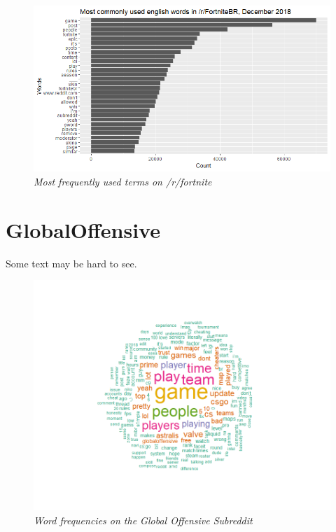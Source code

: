 \begin{figure}[H]
    \centering
    \includegraphics[width=1.0\textwidth]{graphs/Fortnite/WordFreq_FortniteBR.png}
    \caption{\textit{Most frequently used terms on /r/fortnite}}
    \label{fig:fortnite_wordfreq}
\end{figure}

\section{GlobalOffensive}
\label{sec:globaloffensive}
Some text may be hard to see.
\begin{figure}[ht]
    \centering
    \includegraphics[width=1.0\textwidth]{graphs/GlobalOffensive/wordcloud_rcsgo.png}
    \caption{\textit{Word frequencies on the Global Offensive Subreddit}}
    \label{fig:go_cloud}
\end{figure}

